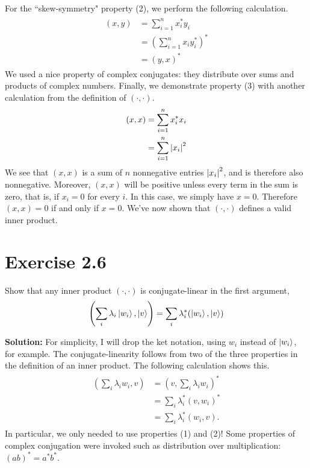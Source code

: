 \documentclass{book}
\begin{document}
    For the ``skew-symmetry" property (2), we perform the following calculation.
    \begin{align}
    \begin{aligned}
        (x, y) &= \sum_{i=1}^n x_i^* y_i \\
        &= \left(\sum_{i=1}^n x_i y_i^*\right)^* \\
        &= (y, x)^*
    \end{aligned}
    \end{align}
    We used a nice property of complex conjugates: they distribute over sums and products of complex numbers. Finally, we demonstrate property (3) with another calculation from the definition of $(\cdot, \cdot)$.
    \begin{align}
    \begin{aligned}
        (x, x) &= \sum_{i=1}^n x_i^* x_i \\
        &= \sum_{i=1}^n \abs{x_i}^2
    \end{aligned}
    \end{align}
    We see that $(x,x)$ is a sum of $n$ nonnegative entries $\abs{x_i}^2$, and is therefore also nonnegative. Moreover, $(x,x)$ will be positive unless every term in the sum is zero, that is, if $x_i = 0$ for every $i$. In this case, we simply have $x = 0$. Therefore $(x,x) = 0$ if and only if $x = 0$. We've now shown that $(\cdot, \cdot)$ defines a valid inner product.
    
\section*{Exercise 2.6}
    Show that any inner product $(\cdot, \cdot)$ is conjugate-linear in the first argument,
    \begin{align}
        \left(\sum_i \lambda_i \ket{w_i}, \ket{v}\right) = \sum_i \lambda_i^* (\ket{w_i}, \ket{v})
    \end{align}
    
    \textbf{Solution:} For simplicity, I will drop the ket notation, using $w_i$ instead of $\ket{w_i}$, for example. The conjugate-linearity follows from two of the three properties in the definition of an inner product. The following calculation shows this.
    \begin{align}
    \begin{aligned}
        \left(\sum_i \lambda_i w_i, v\right) &= \left(v, \sum_i \lambda_i w_i\right)^* \\
        &= \sum_i \lambda_i^* (v, w_i)^* \\
        &= \sum_i \lambda_i^* (w_i, v).
    \end{aligned}
    \end{align}
    In particular, we only needed to use properties (1) and (2)! Some properties of complex conjugation were invoked such as distribution over multiplication: $(ab)^* = a^* b^*$.
    
\end{document}
